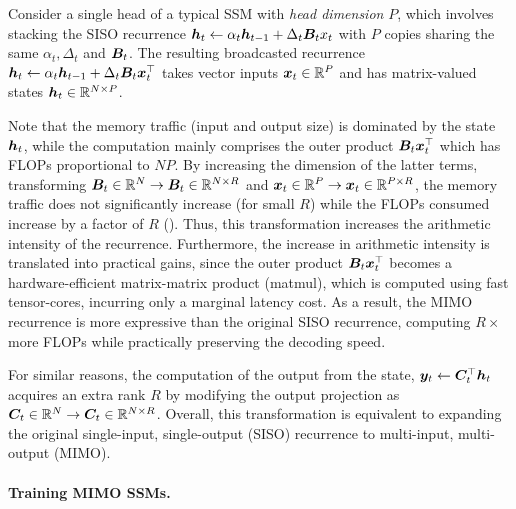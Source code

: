 Consider a single head of a typical SSM with \emph{head dimension} $P$,
which involves stacking the SISO recurrence ${\bm{h}}_t \gets \alpha_t{\bm{h}}_{t-1} + \Delta_t{\bm{B}}_t x_t$ with $P$ copies sharing the same $\alpha_t, \Delta_t$ and ${\bm{B}}_t$.
The resulting broadcasted recurrence ${\bm{h}}_t \gets \alpha_t {\bm{h}}_{t-1} + \Delta_t{\bm{B}}_t {\bm{x}}_t^\top$ takes vector inputs ${\bm{x}}_t \in \mathbb{R}^P$ and has matrix-valued states ${\bm{h}}_t \in \mathbb{R}^{N \times P}$.

Note that the memory traffic (input and output size) is dominated by the state ${\bm{h}}_t$, while the computation mainly comprises the outer product ${\bm{B}}_t {\bm{x}}_t^\top$ which has FLOPs proportional to $NP$.
By increasing the dimension of the latter terms, transforming ${\bm{B}}_t \in \mathbb{R}^{N} \to {\bm{B}}_t \in \mathbb{R}^{N \times R}$ and ${\bm{x}}_t \in \mathbb{R}^{P} \to {\bm{x}}_t \in \mathbb{R}^{P \times R}$,
the memory traffic does not significantly increase (for small $R$) while the FLOPs consumed increase by a factor of $R$ ().
Thus, this transformation increases the arithmetic intensity of the recurrence.
Furthermore, the increase in arithmetic intensity is translated into practical gains, since the outer product ${\bm{B}}_t {\bm{x}}_t^\top$ becomes a hardware-efficient matrix-matrix product (matmul), which is computed using fast tensor-cores, incurring only a marginal latency cost.
As a result, the MIMO recurrence is more expressive than the original SISO recurrence, computing $R {\scriptstyle\times}$ more FLOPs while practically preserving the decoding speed.

For similar reasons, the computation of the output from the state, ${\bm{y}}_t \gets {\bm{C}}_t^\top {\bm{h}}_t$ acquires an extra rank $R$ by modifying the output projection as ${\bm{C}}_t \in \mathbb{R}^{N} \to {\bm{C}}_t \in \mathbb{R}^{N \times R}$.
Overall, this transformation is equivalent to expanding the original single-input, single-output (SISO) recurrence to multi-input, multi-output (MIMO).

\paragraph{Training MIMO SSMs.}

